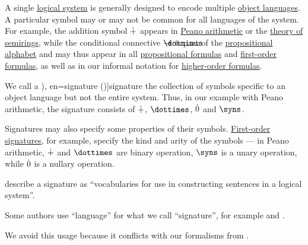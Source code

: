 \begin{concept}\label{con:logical_system_signature}
  A single \hyperref[con:logical_system]{logical system} is generally designed to encode multiple \hyperref[con:metalogic]{object languages}. A particular symbol may or may not be common for all languages of the system. For example, the addition symbol \( {\mathbin{\dotplus}} \) appears in \hyperref[def:peano_arithmetic]{Peano arithmetic} or the \hyperref[def:semiring/theory]{theory of semirings}, while the conditional connective \( {\synimplies} \) is part of the \hyperref[def:propositional_alphabet]{propositional alphabet} and may thus appear in all \hyperref[def:propositional_syntax/formula]{propositional formulas} and \hyperref[def:first_order_syntax/formula]{first-order formulas}, as well as in our informal notation for \hyperref[def:simply_typed_hol_formula]{higher-order formulas}.

  We call a \term[ru=сигнатура (логики первого порядка) (\cite[73]{ШеньВерещагин2017ЯзыкиИИсчисления}), en=signature (\cite[97]{GoguenBurstall1992Institutions})]{signature} the collection of symbols specific to an object language but not the entire system. Thus, in our example with Peano arithmetic, the signature consists of \( {\mathbin{\dotplus}} \), \( {\syntimes} \), \( \dot{0} \) and \( \syns \).

  Signatures may also specify some properties of their symbols. \hyperref[def:first_order_signature]{First-order signatures}, for example, specify the kind and arity of the symbols --- in Peano arithmetic, \( {\mathbin{\dotplus}} \) and \( {\syntimes} \) are binary operation, \( \syns \) is a unary operation, while \( \dot{0} \) is a nullary operation.
\end{concept}
\begin{comments}
  \item {} describe a signature as \enquote{vocabularies for use in constructing sentences in a logical system}.

  \item Some authors use \enquote{language} for what we call \enquote{signature}, for example  and .

  We avoid this usage because it conflicts with our formalisms from .
\end{comments}

